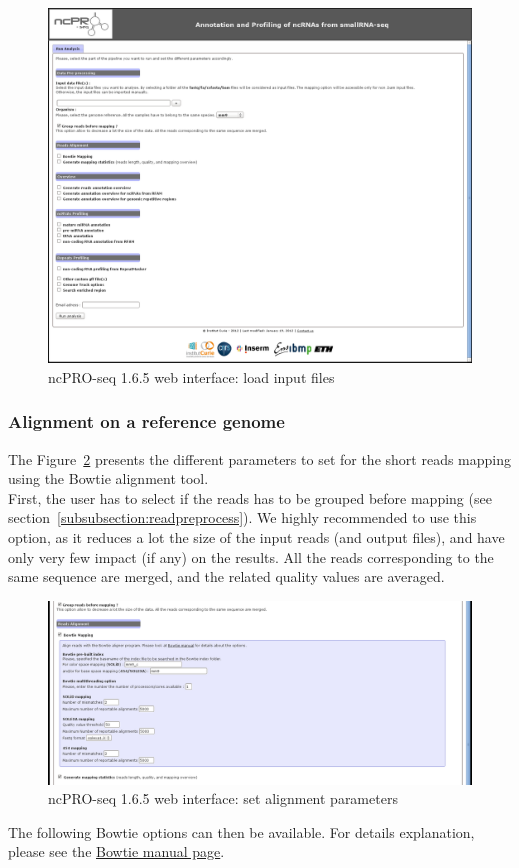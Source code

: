 \documentclass[12pt]{article}
\def \ncpip{ncPRO-seq 1.6.5}
\begin{document}
\begin{figure}[!h]
\includegraphics[width=\textwidth]{web_1.png}
\caption{\ncpip{} web interface: load input files}
\label{fig:web1}
\end{figure} 
\subsubsection{Alignment on a reference genome}
The Figure~\ref{fig:web2} presents the different parameters to set for the short reads mapping using the Bowtie alignment tool.\\
First, the user has to select if the reads has to be grouped before mapping (see section~\ref{subsubsection:readpreprocess}). We highly recommended to use this option, as it reduces a lot the size of the input reads (and output files), and have only very few impact (if any) on the results. All the reads corresponding to the same sequence are merged, and the related quality values are averaged.\\
\begin{figure}[!h]
\includegraphics[width=\textwidth]{web_2.png}
\caption{\ncpip{} web interface: set alignment parameters}
\label{fig:web2}
\end{figure} 
The following Bowtie options can then be available. For details explanation, please see the \href{http://bowtie-bio.sourceforge.net/manual.shtml}{ Bowtie manual page}.
\end{document}
